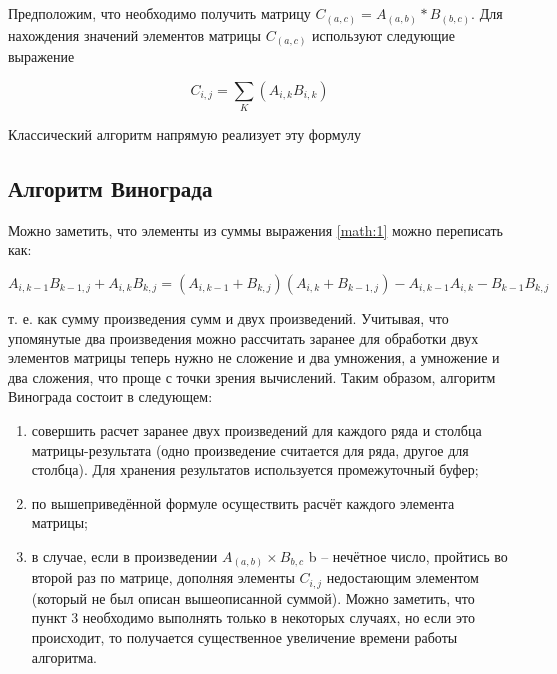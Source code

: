 	Предположим, что необходимо получить матрицу $C_{(a,c)} = A_{(a,b)} * B_{(b,c)}$. Для нахождения значений элементов матрицы $C_{(a,c)}$ используют следующие выражение\cite{makkonell}
	
	\begin{center}
		\begin{equation}
		\label{math:1}
		C_{i,j} = \sum_{K}(A_{i, k}B_{i,k})
		\end{equation}
	\end{center}
		
	Классический алгоритм напрямую реализует эту формулу

	\subsection{Алгоритм Винограда}
	
	Можно заметить, что элементы из суммы выражения \ref{math:1} можно переписать как:
	
	\begin{equation}
		A_{i, k-1}B_{k-1,j} + A_{i,k}B_{k,j} = (A_{i,k-1} + B_{k,j})(A_{i,k} + B_{k-1,j}) - A_{i,k-1}A_{i,k} - B_{k-1}B_{k,j}
	\end{equation}
	
	т. е. как сумму произведения сумм и двух произведений. Учитывая, что упомянутые два произведения можно рассчитать заранее для обработки двух элементов матрицы теперь нужно не сложение и два умножения, а умножение и два сложения, что проще с точки зрения вычислений. Таким образом, алгоритм Винограда состоит в следующем:
	
	\begin{enumerate}
		\item совершить расчет заранее двух произведений для каждого ряда и столбца матрицы-результата (одно произведение считается для ряда, другое для столбца). Для хранения результатов используется промежуточный буфер;
		
		\item по вышеприведённой формуле осуществить расчёт каждого элемента матрицы;
		
		\item в случае, если в произведении $A_{(a,b)} \times B_{b,c}$ b – нечётное число, пройтись во второй раз по матрице, дополняя элементы $C_{i,j}$ недостающим элементом (который не был описан вышеописанной суммой). Можно заметить, что пункт 3 необходимо выполнять только в некоторых случаях, но если это происходит, то получается существенное увеличение времени работы алгоритма.
	\end{enumerate} 
	
